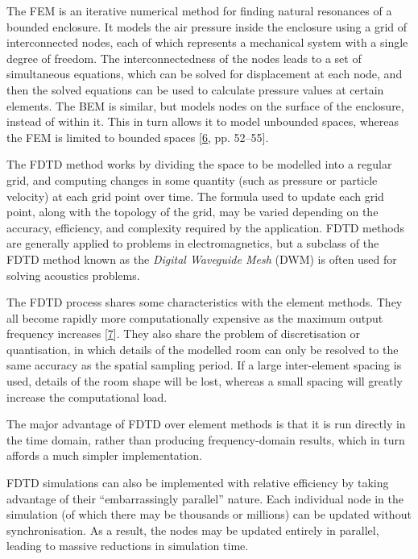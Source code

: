 \documentclass[]{scrreprt}
\begin{document}
The FEM is an iterative numerical method for finding natural resonances
of a bounded enclosure. It models the air pressure inside the enclosure
using a grid of interconnected nodes, each of which represents a
mechanical system with a single degree of freedom. The
interconnectedness of the nodes leads to a set of simultaneous
equations, which can be solved for displacement at each node, and then
the solved equations can be used to calculate pressure values at certain
elements. The BEM is similar, but models nodes on the surface of the
enclosure, instead of within it. This in turn allows it to model
unbounded spaces, whereas the FEM is limited to bounded spaces
{[}\protect\hyperlink{ref-murphyux5fdigitalux5f2000}{6}, pp. 52--55{]}.

The FDTD method works by dividing the space to be modelled into a
regular grid, and computing changes in some quantity (such as pressure
or particle velocity) at each grid point over time. The formula used to
update each grid point, along with the topology of the grid, may be
varied depending on the accuracy, efficiency, and complexity required by
the application. FDTD methods are generally applied to problems in
electromagnetics, but a subclass of the FDTD method known as the
\emph{Digital Waveguide Mesh} (DWM) is often used for solving acoustics
problems.

The FDTD process shares some characteristics with the element methods.
They all become rapidly more computationally expensive as the maximum
output frequency increases
{[}\protect\hyperlink{ref-valimakiux5ffiftyux5f2012}{7}{]}. They also
share the problem of discretisation or quantisation, in which details of
the modelled room can only be resolved to the same accuracy as the
spatial sampling period. If a large inter-element spacing is used,
details of the room shape will be lost, whereas a small spacing will
greatly increase the computational load.

The major advantage of FDTD over element methods is that it is run
directly in the time domain, rather than producing frequency-domain
results, which in turn affords a much simpler implementation.

FDTD simulations can also be implemented with relative efficiency by
taking advantage of their ``embarrassingly parallel'' nature. Each
individual node in the simulation (of which there may be thousands or
millions) can be updated without synchronisation. As a result, the nodes
may be updated entirely in parallel, leading to massive reductions in
simulation time.
\end{document}
